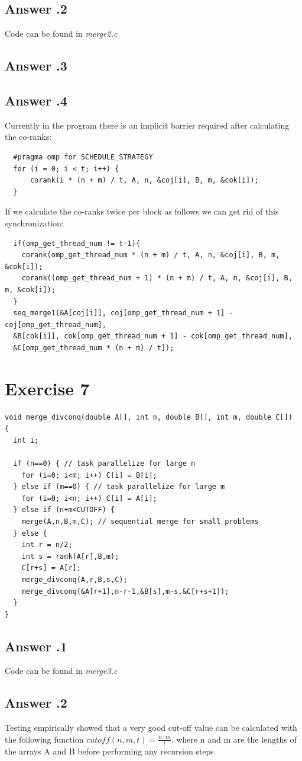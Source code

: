 \documentclass[a4paper,%
11pt,%
DIV=12,
headsepline,%
headings=normal,
]{scrartcl}
\newcounter{curex}
\newcommand{\exercise}[1]{\section*{Exercise #1}\setcounter{curex}{#1}}
\newcommand{\answer}[1]{\subsection*{Answer \arabic{curex}.#1}}
\begin{document}
\answer{2}
Code can be found in \textit{merge2.c}
\answer{3}
\answer{4}
Currently in the program there is an implicit barrier required after calculating the co-ranks:\\
  \begin{minipage}[t]{1.0\linewidth}
\begin{lstlisting}
  #pragma omp for SCHEDULE_STRATEGY
  for (i = 0; i < t; i++) {
      corank(i * (n + m) / t, A, n, &coj[i], B, m, &cok[i]);
  }
  \end{lstlisting}
\end{minipage}
If we calculate the co-ranks twice per block as follows we can get rid of this synchronization:
  \begin{minipage}[t]{1.0\linewidth}
\begin{lstlisting}
  if(omp_get_thread_num != t-1){
    corank(omp_get_thread_num * (n + m) / t, A, n, &coj[i], B, m, &cok[i]);
    corank((omp_get_thread_num + 1) * (n + m) / t, A, n, &coj[i], B, m, &cok[i]);
  }
  seq_merge1(&A[coj[i]], coj[omp_get_thread_num + 1] - coj[omp_get_thread_num], 
  &B[cok[i]], cok[omp_get_thread_num + 1] - cok[omp_get_thread_num], 
  &C[omp_get_thread_num * (n + m) / t]);
  \end{lstlisting}
\end{minipage}

\exercise{7}

\begin{minipage}[t]{1.0\linewidth}
\begin{lstlisting}
void merge_divconq(double A[], int n, double B[], int m, double C[])
{
  int i;

  if (n==0) { // task parallelize for large n
    for (i=0; i<m; i++) C[i] = B[i];
  } else if (m==0) { // task parallelize for large m
    for (i=0; i<n; i++) C[i] = A[i];
  } else if (n+m<CUTOFF) {
    merge(A,n,B,m,C); // sequential merge for small problems
  } else {
    int r = n/2;
    int s = rank(A[r],B,m);
    C[r+s] = A[r];
    merge_divconq(A,r,B,s,C);
    merge_divconq(&A[r+1],n-r-1,&B[s],m-s,&C[r+s+1]);
  }
}
\end{lstlisting}
\end{minipage}

\answer{1}
Code can be found in \textit{merge3.c}
\answer{2}
Testing empirically showed that a very good cut-off value can be calculated with the following function $cutoff(n,m,t) = \frac{n \cdot m}{t}$.
where n and m are the lengths of the arrays A and B before performing any recursion steps
\end{document}
